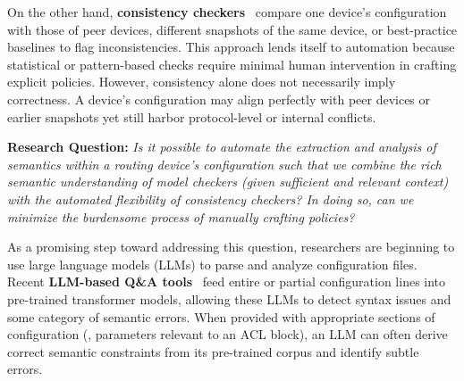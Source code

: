 On the other hand, \textbf{consistency
	checkers}~\cite{kakarla2024diffy,kakarla2020finding, le2006minerals,
	feamster2005detecting, tang2021campion, le2008detecting, le2006characterization}
compare one device’s configuration with those of peer devices, different
snapshots of the same device,  or best-practice baselines to flag
inconsistencies. This approach lends itself to automation because statistical
or pattern-based checks require minimal human intervention in crafting
explicit policies. However, consistency alone does not necessarily imply
correctness. A device’s configuration may align perfectly with peer devices or
earlier snapshots yet still harbor protocol-level or internal conflicts.


\smallskip
\noindent
\textbf{Research Question:}
\emph{Is it possible to automate the extraction and analysis of \emph{semantics}
	within a routing device’s configuration such that we combine the rich
	semantic understanding of model checkers (given sufficient and relevant
	context) with the automated flexibility of consistency checkers? In doing so,
	can we minimize the burdensome process of manually crafting policies?}
\smallskip

As a promising step toward addressing this question, researchers are beginning
to use large language models (LLMs) to parse and analyze configuration files.
Recent \textbf{LLM-based Q\&A
	tools}~\cite{bogdanov2024leveraging,chen2024automatic,wang2024identifying,liu2024large,
	wang2024netconfeval, lian2023configuration} feed entire or partial
configuration lines into pre-trained transformer models, allowing these LLMs
to detect syntax issues and some category of semantic errors. When provided
with appropriate sections of configuration (\eg, parameters relevant to an ACL
block), an LLM can often derive correct semantic constraints from its
pre-trained corpus  and identify subtle errors.

